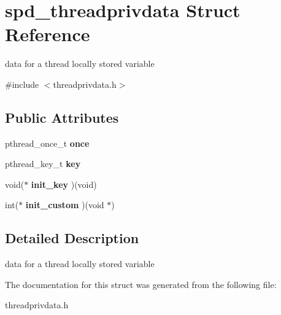 \hypertarget{structspd__threadprivdata}{
\section{spd\_\-threadprivdata Struct Reference}
\label{structspd__threadprivdata}
}


data for a thread locally stored variable  




{\ttfamily \#include $<$threadprivdata.h$>$}

\subsection*{Public Attributes}
\begin{DoxyCompactItemize}
\item 
\hypertarget{structspd__threadprivdata_a0afc3358fb7aeb006a126a9967b709d5}{
pthread\_\-once\_\-t {\bfseries once}}
\label{structspd__threadprivdata_a0afc3358fb7aeb006a126a9967b709d5}

\item 
\hypertarget{structspd__threadprivdata_a4a11c9361e8a5a39f4a6efda5e078e63}{
pthread\_\-key\_\-t {\bfseries key}}
\label{structspd__threadprivdata_a4a11c9361e8a5a39f4a6efda5e078e63}

\item 
\hypertarget{structspd__threadprivdata_a4beebf7e6ca191f6eca4a3ac429e1438}{
void($\ast$ {\bfseries init\_\-key} )(void)}
\label{structspd__threadprivdata_a4beebf7e6ca191f6eca4a3ac429e1438}

\item 
\hypertarget{structspd__threadprivdata_a1ba888b0310c45edf58c0061518f0c33}{
int($\ast$ {\bfseries init\_\-custom} )(void $\ast$)}
\label{structspd__threadprivdata_a1ba888b0310c45edf58c0061518f0c33}

\end{DoxyCompactItemize}


\subsection{Detailed Description}
data for a thread locally stored variable 

The documentation for this struct was generated from the following file:\begin{DoxyCompactItemize}
\item 
threadprivdata.h\end{DoxyCompactItemize}
